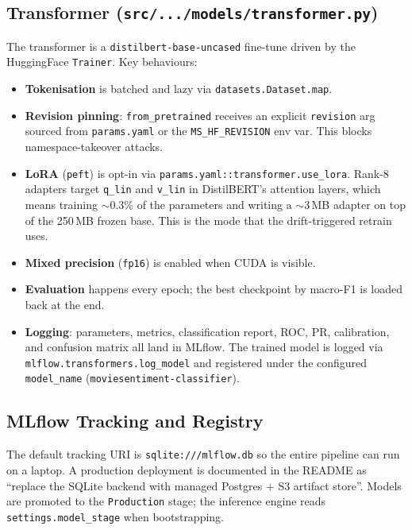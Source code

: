 \documentclass[11pt,a4paper]{article}
\begin{document}
\subsection{Transformer (\texttt{src/.../models/transformer.py})}

The transformer is a \texttt{distilbert-base-uncased} fine-tune driven by the
HuggingFace \texttt{Trainer}. Key behaviours:

\begin{itemize}[leftmargin=*]
\item \textbf{Tokenisation} is batched and lazy via \texttt{datasets.Dataset.map}.
\item \textbf{Revision pinning}: \texttt{from\_pretrained} receives an explicit
      \texttt{revision} arg sourced from \texttt{params.yaml} or the
      \texttt{MS\_HF\_REVISION} env var. This blocks namespace-takeover attacks.
\item \textbf{LoRA} (\texttt{peft}) is opt-in via \texttt{params.yaml::transformer.use\_lora}.
      Rank-8 adapters target \texttt{q\_lin} and \texttt{v\_lin} in DistilBERT's
      attention layers, which means training $\sim$0.3\% of the parameters and
      writing a $\sim$3\,MB adapter on top of the 250\,MB frozen base. This is the
      mode that the drift-triggered retrain uses.
\item \textbf{Mixed precision} (\texttt{fp16}) is enabled when CUDA is visible.
\item \textbf{Evaluation} happens every epoch; the best checkpoint by macro-F1 is
      loaded back at the end.
\item \textbf{Logging}: parameters, metrics, classification report, ROC, PR,
      calibration, and confusion matrix all land in MLflow. The trained model is
      logged via \texttt{mlflow.transformers.log\_model} and registered under the
      configured \texttt{model\_name} (\texttt{moviesentiment-classifier}).
\end{itemize}

\subsection{MLflow Tracking and Registry}

The default tracking URI is \texttt{sqlite:///mlflow.db} so the entire pipeline can
run on a laptop. A production deployment is documented in the README as ``replace the
SQLite backend with managed Postgres + S3 artifact store''. Models are promoted to
the \texttt{Production} stage; the inference engine reads
\texttt{settings.model\_stage} when bootstrapping.
\end{document}
